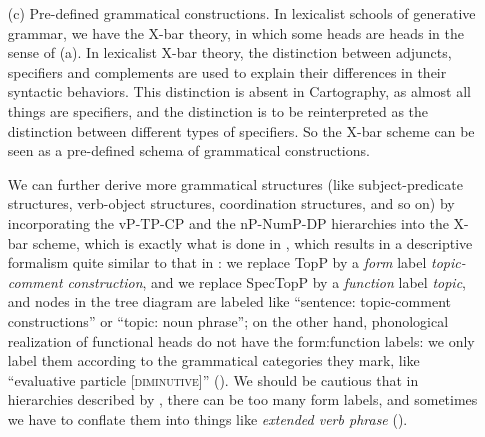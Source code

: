 \documentclass[UTF8, a4paper, oneside, scheme=plain, 12pt]{ctexrep}
\newcommand*{\citepage}[1]{p.~{#1}}
\newcommand*{\term}[1]{\emph{#1}}
\newcommand{\form}[1]{\emph{#1}}
\newcommand*{\category}[1]{\textsc{#1}}
\begin{document}
{\begin{itemize}
    Another issue is the relation between constituency and dependency.
    The two are basically two notations for the same thing \citep{boston2009dependency}.
    Here hierarchical relations can be represented by assigning ``closeness'' values to dependency arcs.
    Dependency analyses are particularly wieldy when movements are frequent.
    \citet[\citepage{55}]{cgel}, for instance, mentions \term{indirect complements},
    which are originally a part of the core argument structure of an adjective
    in a noun phrase and has to appear post-nominally.
    Its relation with the adjective that licenses it therefore is ideally reflected 
    by a dependency arc in a descriptive grammar,
    although a movement-based constituency analysis is of course possible.
    
    \item[(c)] Pre-defined grammatical constructions.
    In lexicalist schools of generative grammar,
    we have the X-bar theory, in which some heads are heads in the sense of (a).
    In lexicalist X-bar theory, the distinction between adjuncts, specifiers and complements
    are used to explain their differences in their syntactic behaviors.
    This distinction is absent in Cartography,
    as almost all things are specifiers, and the distinction is to be reinterpreted
    as the distinction between different types of specifiers.
    So the X-bar scheme can be seen as a pre-defined schema of grammatical constructions.
    
    We can further derive more grammatical structures 
    (like subject-predicate structures, verb-object structures, coordination structures, and so on)
    by incorporating the vP-TP-CP and the nP-NumP-DP hierarchies into the X-bar scheme,
    which is exactly what is done in \citet{deng2010formal},
    which results in a descriptive formalism quite similar to that in \citet{cgel}:
    we replace TopP by a \term{form} label \term{topic-comment construction},
    and we replace SpecTopP by a \term{function} label \term{topic},
    and nodes in the tree diagram are labeled like ``sentence: topic-comment constructions''
    or ``topic: noun phrase'';
    on the other hand, phonological realization of functional heads
    do not have the form:function labels:
    we only label them according to the grammatical categories they mark,
    like ``evaluative particle [\category{diminutive}]'' ().
    We should be cautious that in hierarchies described by \citet{cinque1999adverbs},
    there can be too many form labels,
    and sometimes we have to conflate them into things like \form{extended verb phrase}
    ().
\end{itemize}

}
\end{document}

